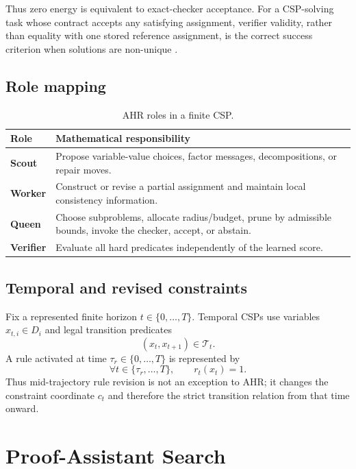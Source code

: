 \documentclass[11pt,oneside]{book}
\theoremstyle{remark}
\begin{document}
Thus zero energy is equivalent to exact-checker acceptance. For a CSP-solving
task whose contract accepts any satisfying assignment, verifier validity,
rather than equality with one stored reference assignment, is the correct
success criterion when solutions are non-unique
\cite{FalkenburgVerified2026,FalkenburgAHRCSP2026}.

\section{Role mapping}

\begin{table}[H]
\centering
\caption{AHR roles in a finite CSP.}
\begin{tabularx}{0.94\textwidth}{>{\bfseries}p{}X}
\toprule
Role & Mathematical responsibility \\
\midrule
Scout & Propose variable-value choices, factor messages, decompositions, or repair moves. \\
Worker & Construct or revise a partial assignment and maintain local consistency information. \\
Queen & Choose subproblems, allocate radius/budget, prune by admissible bounds, invoke the checker, accept, or abstain. \\
Verifier & Evaluate all hard predicates independently of the learned score. \\
\bottomrule
\end{tabularx}
\end{table}

\section{Temporal and revised constraints}

Fix a represented finite horizon $t\in\{0,\ldots,T\}$. Temporal CSPs use
variables $x_{t,i}\in D_i$ and legal transition predicates
\[
(x_t,x_{t+1})\in\mathcal T_t.
\]
A rule activated at time
$\tau_r\in\{0,\ldots,T\}$ is represented by
\[
\forall t\in\{\tau_r,\ldots,T\},\qquad r_t(x_t)=1.
\]
Thus mid-trajectory rule revision is not an exception to AHR; it changes the constraint coordinate $c_t$ and therefore the strict transition relation from that time onward.

\chapter{Proof-Assistant Search}
\end{document}
